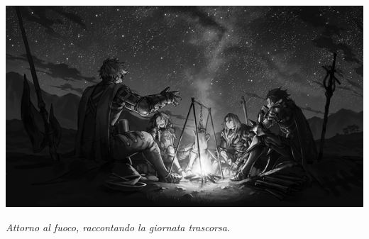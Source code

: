 \begin{multicols}{2}

\end{multicols}

\vfill

\begin{center}

\includegraphics[width=0.9\linewidth]{immagini/Granblue.Fantasy.full.2108782.png}


\emph{Attorno al fuoco, raccontando la giornata trascorsa.}
\end{center}

